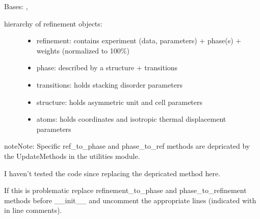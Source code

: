 \documentclass[letterpaper,10pt,english]{sphinxmanual}
\begin{document}
\begin{fulllineitems}
\label{\detokenize{rst/refinement:mstack.refinement.Refinement}}
Bases: {\hyperref[\detokenize{rst/utilities:mstack.utilities.MergeParams}]{}}, {\hyperref[\detokenize{rst/utilities:mstack.utilities.UpdateMethods}]{}}
\begin{description}
\item[{hierarchy of refinement objects:}] \leavevmode\begin{itemize}
\item {} 
refinement: contains experiment (data, parameters) + phase(s) + weights (normalized to 100\%)

\item {} 
phase: described by a structure + transitions

\item {} 
transitions: holds stacking disorder parameters

\item {} 
structure: holds asymmetric unit and cell parameters

\item {} 
atoms: holds coordinates and isotropic thermal displacement parameters

\end{itemize}

\end{description}

\begin{sphinxadmonition}{note}{Note:}
Specific ref\_to\_phase and phase\_to\_ref methods are depricated by the UpdateMethods
in the utilities module.

I haven't tested the code since replacing the depricated method here.

If this is problematic replace refinement\_to\_phase and phase\_to\_refinement
methods before \_\_init\_\_ and uncomment the appropriate lines (indicated
with in line comments).
\end{sphinxadmonition}


\end{fulllineitems}
\end{document}
